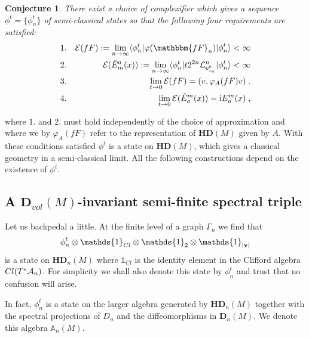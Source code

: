 \documentclass[12pt]{article}
\def\G{\Gamma}
\def\ca{{\cal A}}
\def\ce{{\cal E}}
\def\cl{{\cal L}}
\newtheorem{conj}[thm]{Conjecture}
\begin{document}
\begin{conj}
\label{concon}
There exist a choice of complexifier which gives a sequence $\phi^t = \{\phi^t_n\}$ of semi-classical states so that the following four requirements are satisfied:
\begin{eqnarray*}
&1. & \ce(fF):= \lim_{n\rightarrow\infty} \langle \phi^t_n \vert \varphi(\mathbbm{fF}_n)\vert \phi^t_n \rangle <    \infty
\\
&2.&  \ce(\hat{E}_m^a(x)):=    \lim_{n\rightarrow\infty} \langle \phi^t_n \vert    t 2^{2n}   \cl_{{\bf e}^a_{i_n}}^n   \vert \phi^t_n \rangle <    \infty
\\
&3.& \lim_{t\rightarrow 0} \ce(fF) = (v, \varphi_A(fF) v) \;.
\\
&4.& \lim_{t\rightarrow 0} \ce(\hat{E}^m_a(x)) = \mathrm{i} E^m_a(x)\;,
\end{eqnarray*}
\end{conj}
where 1. and 2. must hold independently of the choice of approximation and where we by $\varphi_A(fF)$ refer to the representation of $\mathbf{HD}(M) $ given by $A$. 
With these conditions satisfied $\phi^t$ is a state on $\mathbf{HD}(M) $, which gives a classical geometry in a semi-classical limit. All the following constructions depend on the existence of $\phi^t$.









\subsection{A $\mathbf{D}_{vol}(M) $-invariant semi-finite spectral triple}









Let us backpedal a little. At the finite level of a graph $\G_n$ we find that $$\phi^t_n\otimes \mathds{1}_{Cl}\otimes \mathds{1}_{2}\otimes \mathds{1}_{\vert {\bf v} \vert }$$ is a state on $\mathbf{HD}_n(M) $ where $ \mathds{1}_{Cl}$ is the identity element in the Clifford algebra $Cl(T^*\ca_n)$. For simplicity we shall also denote this state by $\phi^t_n$ and trust that no confusion will arise. 




In fact, $\phi^t_n$ is a state on the larger algebra generated by $\mathbf{HD}_n(M) $ together with the spectral projections of $D_n$ and the diffeomorphisms in $\mathbf{D}_n(M) $. We denote this algebra $\mathbb{A}_n(M)$.
\end{document}
